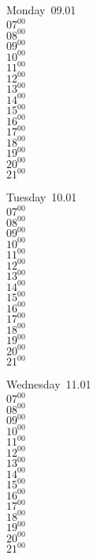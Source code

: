 \documentclass[11pt,a4paper]{book}\usepackage[]{graphicx}\usepackage[]{color}
\begin{document}
\begin{headerbox}
\end{headerbox}
\begin{weekdaybox}
  Monday~09.01\\
  { 
  \vfill
  $07^{00}$\\
$08^{00}$\\
$09^{00}$\\
$10^{00}$\\
$11^{00}$\\
$12^{00}$\\
$13^{00}$\\
$14^{00}$\\
$15^{00}$\\
$16^{00}$\\
$17^{00}$\\
$18^{00}$\\
$19^{00}$\\
$20^{00}$\\
$21^{00}$\\
  }
\end{weekdaybox}
\begin{weekdaybox}
  Tuesday~10.01\\
  { 
  \vfill
  $07^{00}$\\
$08^{00}$\\
$09^{00}$\\
$10^{00}$\\
$11^{00}$\\
$12^{00}$\\
$13^{00}$\\
$14^{00}$\\
$15^{00}$\\
$16^{00}$\\
$17^{00}$\\
$18^{00}$\\
$19^{00}$\\
$20^{00}$\\
$21^{00}$\\
  }
\end{weekdaybox}
\begin{weekdaybox}
  Wednesday~11.01\\
  { 
  \vfill
  $07^{00}$\\
$08^{00}$\\
$09^{00}$\\
$10^{00}$\\
$11^{00}$\\
$12^{00}$\\
$13^{00}$\\
$14^{00}$\\
$15^{00}$\\
$16^{00}$\\
$17^{00}$\\
$18^{00}$\\
$19^{00}$\\
$20^{00}$\\
$21^{00}$\\
  }
\end{weekdaybox}
\end{document}
